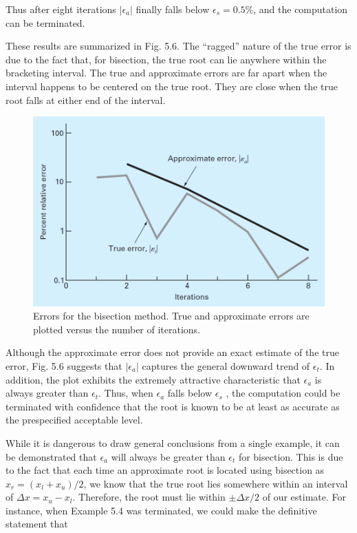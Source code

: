 \documentclass[../main.tex]{subfiles}
\begin{document}
\begin{example}
    \noindent Thus after eight iterations $\left\lvert \epsilon_a \right\rvert $ finally falls below $\epsilon_s = 0.5\%$, and the computation can be
    terminated.

    These results are summarized in Fig. 5.6. The ``ragged'' nature of the true error is due
    to the fact that, for bisection, the true root can lie anywhere within the bracketing interval.
    The true and approximate errors are far apart when the interval happens to be centered
    on the true root. They are close when the true root falls at either end of the interval.

    \begin{figure}[h]
        \includegraphics[width=0.8\linewidth]{./images/fig_5_6}
        \caption{Errors for the bisection method. True and approximate errors are plotted versus the number
        of iterations.}
    \end{figure}    
\end{example}

Although the approximate error does not provide an exact estimate of the true error,
Fig. 5.6 suggests that $\left\lvert \epsilon_a \right\rvert $ captures the general downward trend of $\epsilon_t$. In addition, the plot
exhibits the extremely attractive characteristic that $\epsilon_a$ is always greater than $\epsilon_t$. Thus,
when $\epsilon_a$ falls below $\epsilon_s$ , the computation could be terminated with confidence that the root
is known to be at least as accurate as the prespecified acceptable level.

While it is dangerous to draw general conclusions from a single example, it can be
demonstrated that $\epsilon_a$ will always be greater than $\epsilon_t$ for bisection. This is due to the fact
that each time an approximate root is located using bisection as $x_r = (x_l + x_u)/2$, we know
that the true root lies somewhere within an interval of $\Delta x = x_u - x_l$. Therefore, the root
must lie within $\pm\Delta x/2$ of our estimate. For instance, when Example 5.4 was terminated,
we could make the definitive statement that\\
\end{document}
